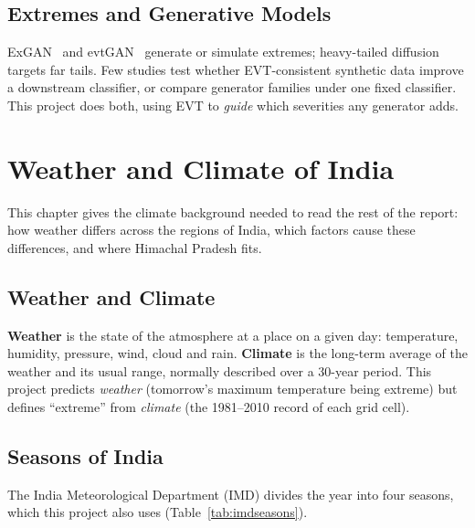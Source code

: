 \documentclass[12pt,a4paper]{report}
\begin{document}
\section{Extremes and Generative Models}
ExGAN~\cite{bhatia2021exgan} and evtGAN~\cite{boulaguiem2022evtgan} generate or simulate extremes; heavy-tailed
diffusion~\cite{pandey2025heavy} targets far tails. Few studies test whether EVT-consistent synthetic data improve a
downstream classifier, or compare generator families under one fixed classifier. This project does both, using EVT to
\emph{guide} which severities any generator adds.

\chapter{Weather and Climate of India}
\label{ch:climate}
This chapter gives the climate background needed to read the rest of the report: how weather differs across the
regions of India, which factors cause these differences, and where Himachal Pradesh fits.

\section{Weather and Climate}
\textbf{Weather} is the state of the atmosphere at a place on a given day: temperature, humidity, pressure, wind,
cloud and rain. \textbf{Climate} is the long-term average of the weather and its usual range, normally described over
a 30-year period. This project predicts \emph{weather} (tomorrow's maximum temperature being extreme) but defines
``extreme'' from \emph{climate} (the 1981--2010 record of each grid cell).

\section{Seasons of India}
The India Meteorological Department (IMD) divides the year into four seasons, which this project also uses
(Table~\ref{tab:imdseasons}).
\end{document}
